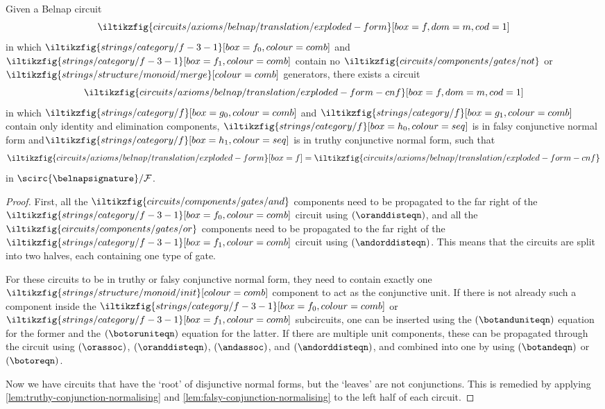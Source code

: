 \begin{proposition}\label{prop:disjunctive-normal-form}
    Given a Belnap circuit \[
        \iltikzfig{circuits/axioms/belnap/translation/exploded-form}[box=f,dom=m,cod=1]
    \] in which \(
    \iltikzfig{strings/category/f-3-1}[box=f_0,colour=comb]
    \) and \(
    \iltikzfig{strings/category/f-3-1}[box=f_1,colour=comb]
    \) contain no \(
    \iltikzfig{circuits/components/gates/not}
    \) or \(
    \iltikzfig{strings/structure/monoid/merge}[colour=comb]
    \) generators, there exists a circuit \[
        \iltikzfig{circuits/axioms/belnap/translation/exploded-form-cnf}[box=f,dom=m,cod=1]
    \] in which \(
    \iltikzfig{strings/category/f}[box=g_0,colour=comb]
    \) and \(
    \iltikzfig{strings/category/f}[box=g_1,colour=comb]
    \) contain only identity and elimination components,
    \(
    \iltikzfig{strings/category/f}[box=h_0,colour=seq]
    \) is in falsy conjunctive normal form and\(
    \iltikzfig{strings/category/f}[box=h_1,colour=seq]
    \) is in truthy conjunctive normal form, such that \[
        \iltikzfig{circuits/axioms/belnap/translation/exploded-form}[box=f]
        =
        \iltikzfig{circuits/axioms/belnap/translation/exploded-form-cnf}
    \] in \(
    \scirc{\belnapsignature} / \mathcal{F}
    \).
\end{proposition}
\begin{proof}
    First, all the \(
    \iltikzfig{circuits/components/gates/and}
    \) components need to be propagated to the far right of the \(
    \iltikzfig{strings/category/f-3-1}[box=f_0,colour=comb]
    \) circuit using \((\oranddisteqn)\), and all the \(
    \iltikzfig{circuits/components/gates/or}
    \) components need to be propagated to the far right of the \(
    \iltikzfig{strings/category/f-3-1}[box=f_1,colour=comb]
    \) circuit using \((\andorddisteqn)\).
    This means that the circuits are split into two halves, each containing
    one type of gate.

    For these circuits to be in truthy or falsy conjunctive normal form, they
    need to contain exactly one \(
    \iltikzfig{strings/structure/monoid/init}[colour=comb]
    \) component to act as the conjunctive unit.
    If there is not already such a component inside the \(
    \iltikzfig{strings/category/f-3-1}[box=f_0,colour=comb]
    \) or \(
    \iltikzfig{strings/category/f-3-1}[box=f_1,colour=comb]
    \) subcircuits, one can be inserted using the \((\botanduniteqn)\) equation
    for the former and the \((\botoruniteqn)\) equation for the latter.
    If there are multiple unit components, these can be propagated through the
    circuit using \((\orassoc)\), \((\oranddisteqn)\), \((\andassoc)\), and
    \((\andorddisteqn)\), and combined into one by using \((\botandeqn)\) or
    \((\botoreqn)\).

    Now we have circuits that have the `root' of disjunctive normal forms, but
    the `leaves' are not conjunctions.
    This is remedied by applying \cref{lem:truthy-conjunction-normalising} and
    \cref{lem:falsy-conjunction-normalising} to the left half of each circuit.
\end{proof}

